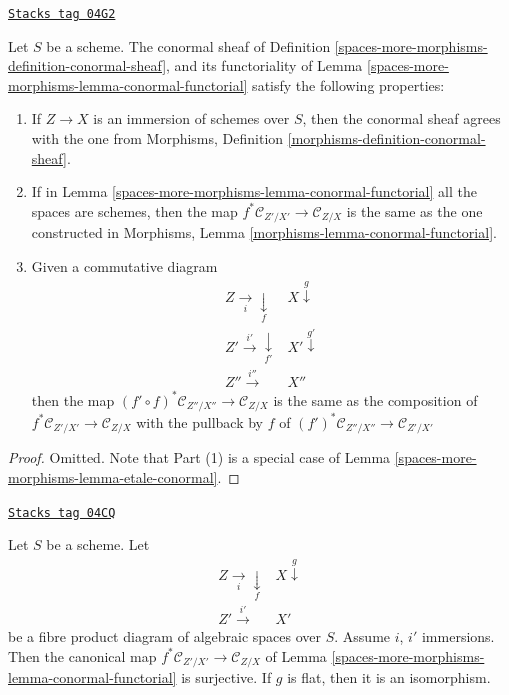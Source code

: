 \begin{lemma}
\label{spaces-more-morphisms-lemma-conormal-functorial-more}
\href{https://stacks.math.columbia.edu/tag/04G2}{\texttt{Stacks tag 04G2}}

Let $S$ be a scheme. The conormal sheaf of
Definition \ref{spaces-more-morphisms-definition-conormal-sheaf}, and its functoriality of
Lemma \ref{spaces-more-morphisms-lemma-conormal-functorial}
satisfy the following properties:
\begin{enumerate}
\item If $Z \to X$ is an immersion of schemes over $S$, then the conormal
sheaf agrees with the one from
Morphisms, Definition \ref{morphisms-definition-conormal-sheaf}.
\item If in
Lemma \ref{spaces-more-morphisms-lemma-conormal-functorial}
all the spaces are schemes, then the map
$f^*\mathcal{C}_{Z'/X'} \to \mathcal{C}_{Z/X}$ is the same
as the one constructed in
Morphisms, Lemma \ref{morphisms-lemma-conormal-functorial}.
\item Given a commutative diagram
$$
\begin{array}{cc}Z \underset{i}{\longrightarrow}\underset{f}{\downarrow} & X \overset{g}{\downarrow} \\ Z' \overset{i'}{\longrightarrow}\underset{f'}{\downarrow} & X' \overset{g'}{\downarrow} \\ Z'' \overset{i''}{\longrightarrow} & X''\end{array}
$$
then the map $(f' \circ f)^*\mathcal{C}_{Z''/X''} \to \mathcal{C}_{Z/X}$
is the same as the composition of
$f^*\mathcal{C}_{Z'/X'} \to \mathcal{C}_{Z/X}$
with the pullback by $f$ of
$(f')^*\mathcal{C}_{Z''/X''} \to \mathcal{C}_{Z'/X'}$
\end{enumerate}
\end{lemma}

\begin{proof}
Omitted. Note that Part (1) is a special case of
Lemma \ref{spaces-more-morphisms-lemma-etale-conormal}.
\end{proof}

\begin{lemma}
\label{spaces-more-morphisms-lemma-conormal-functorial-flat}
\href{https://stacks.math.columbia.edu/tag/04CQ}{\texttt{Stacks tag 04CQ}}

Let $S$ be a scheme. Let
$$
\begin{array}{cc}Z \underset{i}{\longrightarrow}\underset{f}{\downarrow} & X \overset{g}{\downarrow} \\ Z' \overset{i'}{\longrightarrow} & X'\end{array}
$$
be a fibre product diagram of algebraic spaces over $S$. Assume
$i$, $i'$ immersions. Then the canonical map
$f^*\mathcal{C}_{Z'/X'} \to \mathcal{C}_{Z/X}$ of
Lemma \ref{spaces-more-morphisms-lemma-conormal-functorial}
is surjective. If $g$ is flat, then it is an isomorphism.
\end{lemma}


